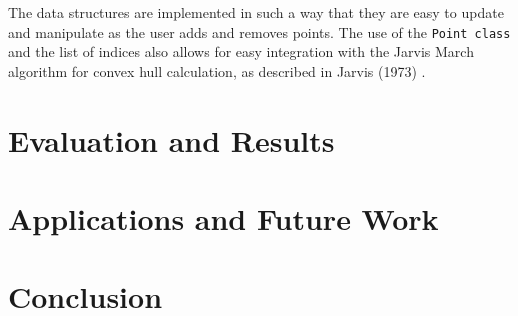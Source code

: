 \documentclass{article}
\begin{document}
\noindent The data structures are implemented in such a way that they are easy to update and manipulate as the user adds and removes points. The use of the \texttt{Point class} and the list of indices also allows for easy integration with the Jarvis March algorithm for convex hull calculation, as described in Jarvis (1973) \cite{jarvis_march}.

\section{Evaluation and Results}

\section{Applications and Future Work}

\section{Conclusion}

{}

\end{document}
